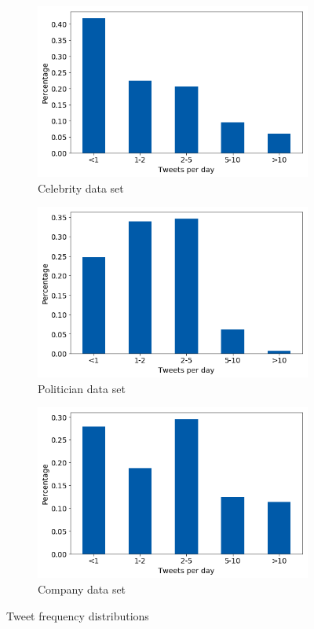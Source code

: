 \begin{figure}[h]
\centering
\begin{subfigure}{.33\textwidth}
  \centering
  \includegraphics[width=.95\linewidth]{img/celeb_freq_distr}
  \caption{Celebrity data set}
  \label{fig:freq_distr_sub1}
\end{subfigure}%
\begin{subfigure}{.33\textwidth}
  \centering
  \includegraphics[width=.95\linewidth]{img/polit_freq_distr}
  \caption{Politician data set}
  \label{fig:freq_distr_sub2}
\end{subfigure}
\begin{subfigure}{.33\textwidth}
  \centering
  \includegraphics[width=.95\linewidth]{img/corp_freq_distr}
  \caption{Company data set}
  \label{fig:freq_distr_sub3}
\end{subfigure}%
\caption{Tweet frequency distributions}
\label{fig:freq_distr}
\end{figure}

